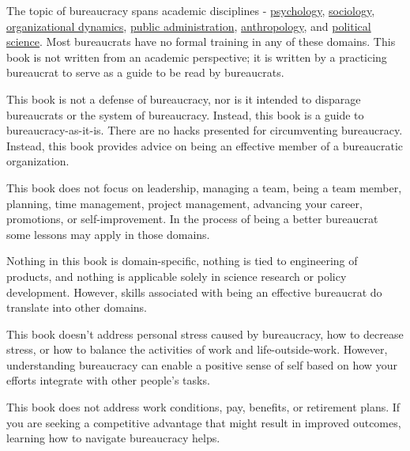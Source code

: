 The topic of bureaucracy spans academic disciplines - \href{https://en.wikipedia.org/wiki/Psychology}{psychology},
\href{https://en.wikipedia.org/wiki/Sociology}{sociology},
\href{https://en.wikipedia.org/wiki/Organizational_behavior}{organizational dynamics},
\href{https://en.wikipedia.org/wiki/Public_administration}{public administration}, 
\href{https://en.wikipedia.org/wiki/Anthropology}{anthropology},
and  
\href{https://en.wikipedia.org/wiki/Political_science}{political science}. 
Most bureaucrats have no formal training in any of these domains. This book is not written from an academic perspective; it is written by a practicing bureaucrat to serve as a guide to be read by bureaucrats. 

This book is not a defense of bureaucracy, nor is it intended to disparage bureaucrats or the system of bureaucracy. Instead, this book is a guide to bureaucracy-as-it-is. There are no hacks presented for circumventing bureaucracy. Instead, this book provides advice on being an effective member of a bureaucratic organization.

This book does not focus on leadership, managing a team, being a team member, planning, time management, project management, advancing your career, promotions, or self-improvement. In the process of being a better bureaucrat some lessons may apply in those domains.


Nothing in this book is domain-specific, nothing is tied to engineering of products, and nothing is applicable solely in science research or policy development. However, skills associated with being an effective bureaucrat do translate into other domains.

This book doesn't address personal stress caused by bureaucracy, how to decrease stress, or how to balance the activities of work and life-outside-work.   However, understanding bureaucracy can enable a positive sense of self based on how your efforts integrate with other people's tasks. 

This book does not address work conditions, pay, benefits, or retirement plans. If you are seeking a competitive advantage that might result in improved outcomes, learning how to navigate bureaucracy helps.


